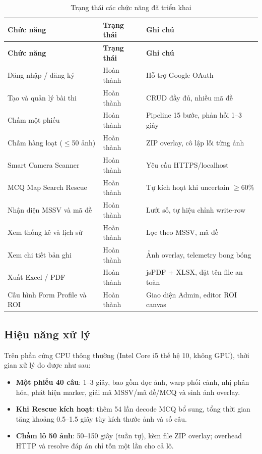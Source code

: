 \begin{longtable}{|L{5.5cm}|L{2.5cm}|L{5.8cm}|}
\caption{Trạng thái các chức năng đã triển khai}
\label{tab:chuc-nang-hoan-thanh}\\
\hline
\textbf{Chức năng} & \textbf{Trạng thái} & \textbf{Ghi chú} \\
\hline
\endfirsthead
\hline
\textbf{Chức năng} & \textbf{Trạng thái} & \textbf{Ghi chú} \\
\hline
\endhead
Đăng nhập / đăng ký & Hoàn thành & Hỗ trợ Google OAuth \\
\hline
Tạo và quản lý bài thi & Hoàn thành & CRUD đầy đủ, nhiều mã đề \\
\hline
Chấm một phiếu & Hoàn thành & Pipeline 15 bước, phản hồi 1--3 giây \\
\hline
Chấm hàng loạt ($\leq$50 ảnh) & Hoàn thành & ZIP overlay, cô lập lỗi từng ảnh \\
\hline
Smart Camera Scanner & Hoàn thành & Yêu cầu HTTPS/localhost \\
\hline
MCQ Map Search Rescue & Hoàn thành & Tự kích hoạt khi uncertain $\geq 60\%$ \\
\hline
Nhận diện MSSV và mã đề & Hoàn thành & Lưới số, tự hiệu chỉnh write-row \\
\hline
Xem thống kê và lịch sử & Hoàn thành & Lọc theo MSSV, mã đề \\
\hline
Xem chi tiết bản ghi & Hoàn thành & Ảnh overlay, telemetry bong bóng \\
\hline
Xuất Excel / PDF & Hoàn thành & jsPDF + XLSX, đặt tên file an toàn \\
\hline
Cấu hình Form Profile và ROI & Hoàn thành & Giao diện Admin, editor ROI canvas \\
\hline
\end{longtable}

\subsection{Hiệu năng xử lý}

Trên phần cứng CPU thông thường (Intel Core i5 thế hệ 10, không GPU), thời gian xử lý đo được như sau:

\begin{itemize}[leftmargin=1.5cm]
  \item \textbf{Một phiếu 40 câu}: 1--3 giây, bao gồm đọc ảnh, warp phối cảnh, nhị phân hóa, phát hiện marker, giải mã MSSV/mã đề/MCQ và sinh ảnh overlay.
  \item \textbf{Khi Rescue kích hoạt}: thêm 54 lần decode MCQ bổ sung, tổng thời gian tăng khoảng 0.5--1.5 giây tùy kích thước ảnh và số câu.
  \item \textbf{Chấm lô 50 ảnh}: 50--150 giây (tuần tự), kèm file ZIP overlay; overhead HTTP và resolve đáp án chỉ tốn một lần cho cả lô.
\end{itemize}

